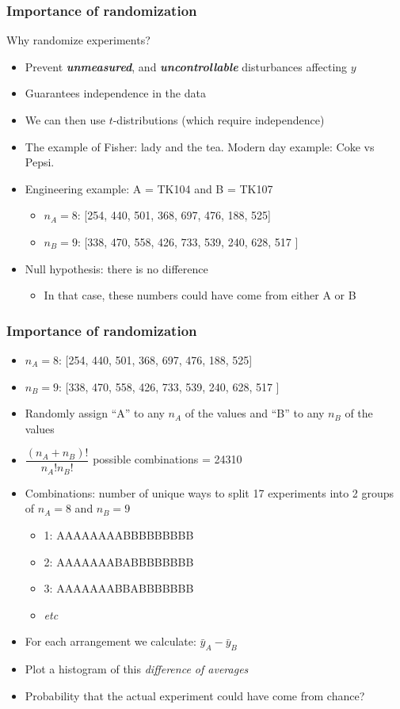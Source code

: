 \begin{frame}\frametitle{Importance of randomization}

	Why randomize experiments?
	\begin{itemize}
		\item	Prevent \textbf{\emph{unmeasured}}, and \textbf{\emph{uncontrollable}} disturbances affecting $y$
		\item	Guarantees independence in the data
		\item	We can then use $t$-distributions (which require independence)
	\end{itemize}
	\begin{itemize}
		\item	The example of Fisher: lady and the tea. Modern day example: Coke vs Pepsi.
		\item	Engineering example: A = TK104 and B = TK107
		\begin{itemize}
			\item	$n_A = 8$: [254, 440, 501, 368, 697, 476, 188, 525]
			\item	$n_B = 9$: [338, 470, 558, 426, 733, 539, 240, 628, 517 ]
		\end{itemize}
		\item	Null hypothesis: there is no difference
		\begin{itemize}
			\item	In that case, these numbers could have come from either A or B
		\end{itemize}
	\end{itemize}
\end{frame}

\begin{frame}\frametitle{Importance of randomization}
	\begin{itemize}
		\item	$n_A = 8$: [254, 440, 501, 368, 697, 476, 188, 525]
		\item	$n_B = 9$: [338, 470, 558, 426, 733, 539, 240, 628, 517 ]
	\end{itemize}
	\begin{itemize}
		\item	Randomly assign ``A'' to any $n_A$ of the values and ``B'' to any $n_B$ of the values
		\item	$\dfrac{(n_A + n_B)!}{n_A! n_B!}$ possible combinations = 24310
		\item	Combinations: number of unique ways to split 17 experiments into 2 groups of $n_A=8$ and $n_B=9$
		\begin{itemize}
			\item	1: AAAAAAAABBBBBBBBB
			\item	2: AAAAAAABABBBBBBBB
			\item	3: AAAAAAABBABBBBBBB
			\item	\emph{etc}
		\end{itemize}
		\item	For each arrangement we calculate: $\bar{y}_A - \bar{y}_B$
		\item	Plot a histogram of this \emph{difference of averages}
		\item	Probability that the actual experiment could have come from chance?
	\end{itemize}
\end{frame}


